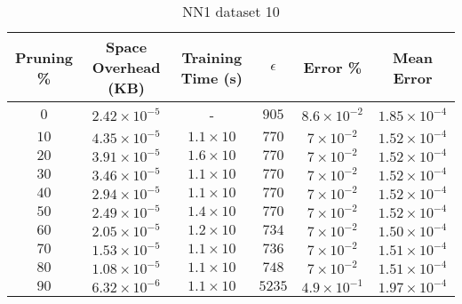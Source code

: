 \begin{adjustwidth}{0cm}{}
\begin{table}
\caption{NN1 dataset 10}\label{pr110}
\begin{tabular}{cccccc}
\hline
\toprule
Pruning \% & Space Overhead (KB) & Training Time (s) & $\epsilon$ & Error \% & Mean Error\\
\midrule
$0$ & $2.42 \times 10^{-5}$ & - & $905$ & $8.6 \times 10^{-2}$ & $1.85 \times 10^{-4}$\\
$10$ & $4.35 \times 10^{-5}$ & $1.1 \times 10$ & $770$ & $7 \times 10^{-2}$ & $1.52 \times 10^{-4}$\\
$20$ & $3.91 \times 10^{-5}$ & $1.6 \times 10$ & $770$ & $7 \times 10^{-2}$ & $1.52 \times 10^{-4}$\\
$30$ & $3.46 \times 10^{-5}$ & $1.1 \times 10$ & $770$ & $7 \times 10^{-2}$ & $1.52 \times 10^{-4}$\\
$40$ & $2.94 \times 10^{-5}$ & $1.1 \times 10$ & $770$ & $7 \times 10^{-2}$ & $1.52 \times 10^{-4}$\\
$50$ & $2.49 \times 10^{-5}$ & $1.4 \times 10$ & $770$ & $7 \times 10^{-2}$ & $1.52 \times 10^{-4}$\\
$60$ & $2.05 \times 10^{-5}$ & $1.2 \times 10$ & $734$ & $7 \times 10^{-2}$ & $1.50 \times 10^{-4}$\\
$70$ & $1.53 \times 10^{-5}$ & $1.1 \times 10$ & $736$ & $7 \times 10^{-2}$ & $1.51 \times 10^{-4}$\\
$80$ & $1.08 \times 10^{-5}$ & $1.1 \times 10$ & $748$ & $7 \times 10^{-2}$ & $1.51 \times 10^{-4}$\\
$90$ & $6.32 \times 10^{-6}$ & $1.1 \times 10$ & $5235$ & $4.9 \times 10^{-1}$ & $1.97 \times 10^{-4}$\\
\bottomrule
\end{tabular}
\end{table}
\end{adjustwidth}

\null\par\null

